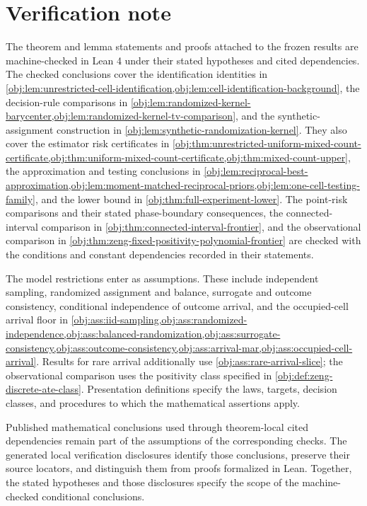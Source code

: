 \section{Verification note}

The theorem and lemma statements and proofs attached to the frozen results are machine-checked in Lean 4 under their stated hypotheses and cited dependencies. The checked conclusions cover the identification identities in \cref{obj:lem:unrestricted-cell-identification,obj:lem:cell-identification-background}, the decision-rule comparisons in \cref{obj:lem:randomized-kernel-barycenter,obj:lem:randomized-kernel-tv-comparison}, and the synthetic-assignment construction in \cref{obj:lem:synthetic-randomization-kernel}. They also cover the estimator risk certificates in \cref{obj:thm:unrestricted-uniform-mixed-count-certificate,obj:thm:uniform-mixed-count-certificate,obj:thm:mixed-count-upper}, the approximation and testing conclusions in \cref{obj:lem:reciprocal-best-approximation,obj:lem:moment-matched-reciprocal-priors,obj:lem:one-cell-testing-family}, and the lower bound in \cref{obj:thm:full-experiment-lower}. The point-risk comparisons and their stated phase-boundary consequences, the connected-interval comparison in \cref{obj:thm:connected-interval-frontier}, and the observational comparison in \cref{obj:thm:zeng-fixed-positivity-polynomial-frontier} are checked with the conditions and constant dependencies recorded in their statements.

The model restrictions enter as assumptions. These include independent sampling, randomized assignment and balance, surrogate and outcome consistency, conditional independence of outcome arrival, and the occupied-cell arrival floor in \cref{obj:ass:iid-sampling,obj:ass:randomized-independence,obj:ass:balanced-randomization,obj:ass:surrogate-consistency,obj:ass:outcome-consistency,obj:ass:arrival-mar,obj:ass:occupied-cell-arrival}. Results for rare arrival additionally use \cref{obj:ass:rare-arrival-slice}; the observational comparison uses the positivity class specified in \cref{obj:def:zeng-discrete-ate-class}. Presentation definitions specify the laws, targets, decision classes, and procedures to which the mathematical assertions apply.

Published mathematical conclusions used through theorem-local cited dependencies remain part of the assumptions of the corresponding checks. The generated local verification disclosures identify those conclusions, preserve their source locators, and distinguish them from proofs formalized in Lean. Together, the stated hypotheses and those disclosures specify the scope of the machine-checked conditional conclusions.
